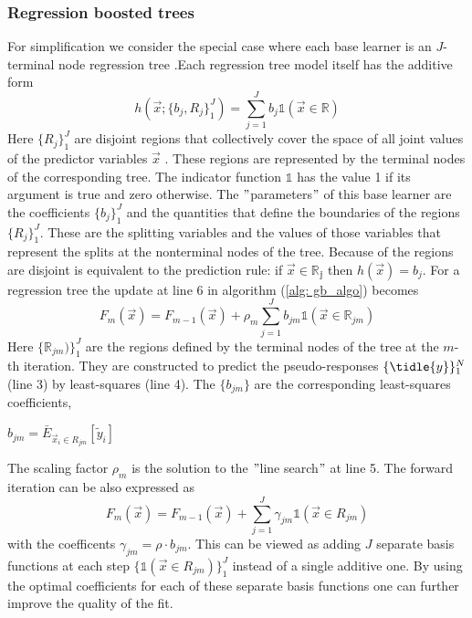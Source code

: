 \documentclass[12pt, a4paper]{article}
\begin{document}
\subsubsection{Regression boosted trees}
For simplification we consider the special case where each base learner is an $J$-terminal node regression tree \cite{Breiman1984}.Each regression tree model itself has the additive form 
\begin{equation}
    h(\vec{x};\{b_j,R_j\}_1^J) = \sum_{j=1}^J b_j \mathds{1}(\vec{x} \in \mathbb{R})
\end{equation}
Here $\{R_j\}_1^J$ are disjoint regions that collectively cover the space of all joint values of the predictor variables $\vec{x}$ \cite{Friedman2001}. These regions are represented by the terminal nodes of the corresponding tree. The indicator function $\mathds{1}$ has the value 1 if its argument is true and zero otherwise. The $"$parameters$"$ of this base learner are the coefficients $\{b_j\}_1^J$ and the quantities that define the boundaries of the regions $\{R_j\}_1^J$. These are the splitting variables and the values of those variables that represent the splits at the nonterminal nodes of the tree. Because of the regions are disjoint is equivalent to the prediction rule: if $\vec{x} \in \mathbb{R_j}$
then $h(\vec{x}) = b_j$.
For a regression tree the update at line 6 in algorithm (\ref{alg: gb_algo}) becomes
\begin{equation}
    F_m(\vec{x}) = F_{m-1}(\vec{x}) + \rho_m \sum_{j=1}^J b_{jm} \mathds{1}(\vec{x} \in \mathbb{R}_{jm})
\end{equation}
Here $\{\mathbb{R}_{jm})\}_1^J$ are the regions defined by the terminal nodes of the tree at the $m$-th iteration. They are constructed to predict the pseudo-responses $\{\tidle{y}\}_1^N$ (line 3) by least-squares (line 4). The $\{b_{jm}\}$ are the corresponding least-squares coefficients,
\begin{center}
    $b_{jm} = \bar{E}_{\vec{x}_i \in R_{jm}}[\tilde{y}_i]$
\end{center}
The scaling factor $\rho_m$ is the solution to the $"$line search$"$ at line 5.
The forward iteration can be also expressed as 
\begin{equation}
        F_m(\vec{x}) = F_{m-1}(\vec{x}) + \sum_{j=1}^J \gamma_{jm} \mathds{1}(\vec{x} \in R_{jm})
\end{equation}
with the coefficents $\gamma_{jm} = \rho \cdot b_{jm}$. This can be viewed as adding $J$ separate basis functions at each step $\{\mathds{1}(\vec{x} \in R_{jm})\}_1^J$ instead of a single additive one. By using the optimal coefficients for each of these separate basis functions  one can further improve the quality of the fit.
\end{document}
